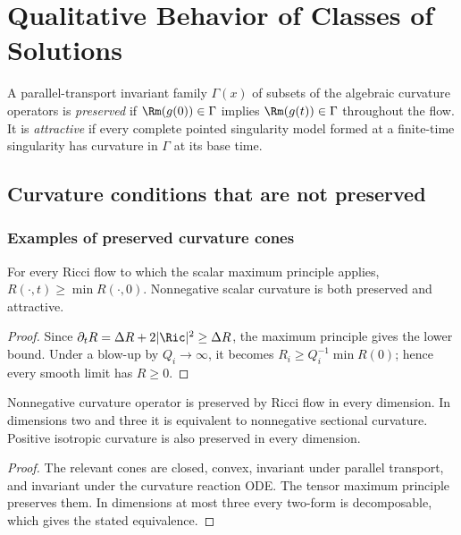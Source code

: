 \chapter[13]{Qualitative Behavior of Classes of Solutions}
\label{ch:chow-ii-qualitative-behavior}

A parallel-transport invariant family \(\Gamma(x)\) of subsets of the
algebraic curvature operators is \emph{preserved} if
\(\Rm(g(0))\in\Gamma\) implies \(\Rm(g(t))\in\Gamma\) throughout the flow.
It is \emph{attractive} if every complete pointed singularity model formed at
a finite-time singularity has curvature in \(\Gamma\) at its base time.

\section{Curvature conditions that are not preserved}

\subsection{Examples of preserved curvature cones}

\begin{example}
\label{ex:chow-ii-nonnegative-scalar-preserved-attractive}
For every Ricci flow to which the scalar maximum principle applies,
\(R(\cdot,t)\geq\min R(\cdot,0)\).  Nonnegative scalar curvature is both
preserved and attractive.
\end{example}
\begin{proof}
\sketch
{}
Since \(\partial_tR=\Delta R+2|\Ric|^2\geq\Delta R\), the maximum principle
gives the lower bound.  Under a blow-up by \(Q_i\to\infty\), it becomes
\(R_i\geq Q_i^{-1}\min R(0)\); hence every smooth limit has \(R\geq0\).
\end{proof}

\begin{example}
\label{ex:chow-ii-nonnegative-curvature-operator-preserved}
Nonnegative curvature operator is preserved by Ricci flow in every dimension.
In dimensions two and three it is equivalent to nonnegative sectional
curvature.  Positive isotropic curvature is also preserved in every dimension.
\end{example}
\begin{proof}
\sketch
{}
The relevant cones are closed, convex, invariant under parallel transport,
and invariant under the curvature reaction ODE.  The tensor maximum principle
preserves them.  In dimensions at most three every two-form is decomposable,
which gives the stated equivalence.
\end{proof}

